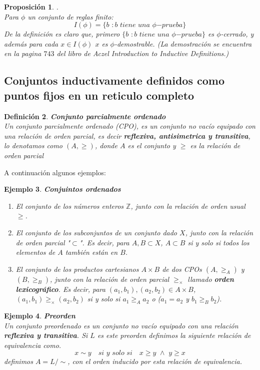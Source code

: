 \documentclass[executivepaper]{article}
\newtheorem{propo}{Proposición}[section]
\newtheorem{defi}[propo]{Definición}
\newtheorem{ejemplo}[propo]{Ejemplo}
\newcommand{\Z}{\mathbb{Z}}
\begin{document}
\begin{propo}.\\
Para $\phi$ un conjunto de reglas finito:
$$I(\phi) = \{b \,\,:b\,\, {tiene}\,\, {una}\,\, \phi {-prueba} \}$$
De la definición es claro que, primero $\{b \,\,: b\,\, tiene\,\, una\,\, \phi{-prueba}\}$ es $\phi$-cerrado, y además para cada $x \in I(\phi)$ $x$ es $\phi$-demostrable. (La demostración se encuentra en la pagina $743$ del libro de Aczel Introduction to Inductive Definitions.)
\end{propo}

\subsection{Conjuntos inductivamente definidos como puntos fijos en un reticulo completo}
\begin{defi}\textbf{Conjunto parcialmente ordenado}\\
    Un conjunto parcialmente ordenado (CPO), es un conjunto no vacío equipado con una relación de orden parcial, es decir \textbf{reflexiva, antisimetrica y transitiva}, lo denotamos como $(A,\geq)$, donde $A$ es el conjunto y $\geq$ es la relación de orden parcial
\end{defi}
A continuación algunos ejemplos:
\begin{ejemplo}\textbf{Conjuintos ordenados}
    \begin{enumerate} 
        \item El conjunto de los números enteros $\Z$, junto con la relación de orden usual $\geq$.
        \item El conjunto de los subconjuntos de un conjunto dado $X$, junto con la relación de orden parcial "$\subset$". Es decir, para $A, B \subset X$, $A \subset B$ si y solo si todos los elementos de $A$ también están en $B$.
        \item El conjunto de los productos cartesianos $A \times B$ de dos CPOs $(A,\geq_A)$ y $(B,\geq_B)$, junto con la relación de orden parcial $\geq_{\times}$ llamado \textbf{orden lexicográfico}. Es decir, para $(a_1,b_1),(a_2,b_2) \in A \times B$, $(a_1,b_1) \geq_{\times} (a_2,b_2)$ si y solo si $a_1 \geq_A a_2$ o ($a_1 = a_2$ y $b_1 \geq_B b_2$).
    \end{enumerate}
\end{ejemplo}
\begin{ejemplo}\textbf{Preorden}\\
    Un conjunto preordenado es un conjunto no vacío equipado con una relación \textbf{reflexiva y transitiva}. Si $L$ es este preorden definimos la siguiente relación de equivalencia como.
    $$x \sim y \quad si\,\, y \,\, solo \,\, si \quad x \geq y \,\, \land \,\, y \geq x$$ 
    definimos $A = L/\sim$, con el orden inducido por esta relación de equivalencia.
\end{ejemplo}
\end{document}

